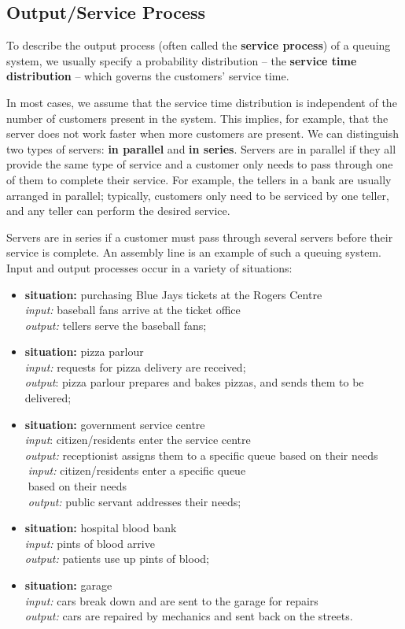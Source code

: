 \subsection{Output/Service Process}
To describe the output process (often called the \textbf{service process}) of a queuing system, we usually specify a probability distribution -- the \textbf{service time distribution} -- which governs the customers' service time. \par In most cases, we assume that the service time distribution is independent of the number of customers present in the system. This implies, for example, that the server does not work faster when more customers are present. \newl We can distinguish two types of servers: \textbf{in parallel} and \textbf{in series}. Servers are in parallel if they all provide the same type of service and a customer only needs to pass through one of them to complete their service. For example, the tellers in a bank are usually arranged in parallel; typically, customers only need to be serviced by one teller, and any teller can perform the desired service. \par Servers are in series if a customer must pass through several servers before their service is complete. An assembly line is an example of such a queuing system.
\newl 
Input and output processes occur in a variety of situations:
\begin{itemize}
\item \textbf{situation:} purchasing Blue Jays tickets at the Rogers Centre\\ \textit{input:} baseball fans arrive at the ticket office\\ \textit{output:} tellers serve the baseball fans;
\item \textbf{situation:} pizza parlour \\ \textit{input:} requests for pizza delivery are received; \\\textit{output}: pizza parlour prepares and bakes pizzas, and sends them to be delivered; 
\item \textbf{situation:} government service centre\\ \textit{input}: citizen/residents enter the service centre \\ \textit{output:} receptionist assigns them to a specific queue based on their needs\\
\textcolor{white}{.}\qquad \textit{input:} citizen/residents enter a specific queue\\ \textcolor{white}{.}\qquad based on their needs \\ \textcolor{white}{.}\qquad \textit{output:} public servant addresses their needs;
\item \textbf{situation:} hospital blood bank\\ \textit{input:} pints of blood arrive\\ \textit{output:} patients use up pints of blood;
\item \textbf{situation:} garage\\ \textit{input:} cars break down and are sent to the garage for repairs\\ \textit{output:} cars are repaired by mechanics and sent back on the streets.
\end{itemize}
